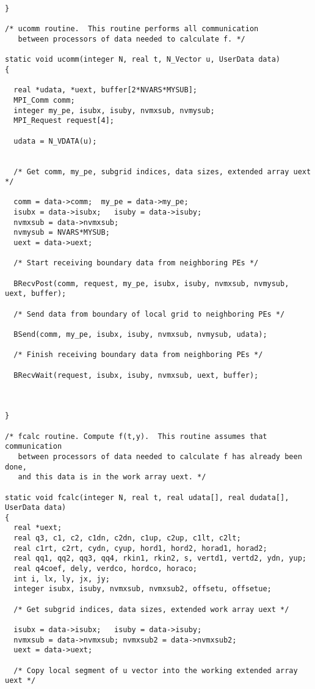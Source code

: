 \begin{verbatim}
}

/* ucomm routine.  This routine performs all communication 
   between processors of data needed to calculate f. */

static void ucomm(integer N, real t, N_Vector u, UserData data)
{

  real *udata, *uext, buffer[2*NVARS*MYSUB];
  MPI_Comm comm;
  integer my_pe, isubx, isuby, nvmxsub, nvmysub;
  MPI_Request request[4];

  udata = N_VDATA(u);


  /* Get comm, my_pe, subgrid indices, data sizes, extended array uext */

  comm = data->comm;  my_pe = data->my_pe;
  isubx = data->isubx;   isuby = data->isuby;
  nvmxsub = data->nvmxsub;
  nvmysub = NVARS*MYSUB;
  uext = data->uext;

  /* Start receiving boundary data from neighboring PEs */

  BRecvPost(comm, request, my_pe, isubx, isuby, nvmxsub, nvmysub, uext, buffer);

  /* Send data from boundary of local grid to neighboring PEs */

  BSend(comm, my_pe, isubx, isuby, nvmxsub, nvmysub, udata);

  /* Finish receiving boundary data from neighboring PEs */

  BRecvWait(request, isubx, isuby, nvmxsub, uext, buffer);



}

/* fcalc routine. Compute f(t,y).  This routine assumes that communication 
   between processors of data needed to calculate f has already been done,
   and this data is in the work array uext. */

static void fcalc(integer N, real t, real udata[], real dudata[], UserData data)
{
  real *uext;
  real q3, c1, c2, c1dn, c2dn, c1up, c2up, c1lt, c2lt;
  real c1rt, c2rt, cydn, cyup, hord1, hord2, horad1, horad2;
  real qq1, qq2, qq3, qq4, rkin1, rkin2, s, vertd1, vertd2, ydn, yup;
  real q4coef, dely, verdco, hordco, horaco;
  int i, lx, ly, jx, jy;
  integer isubx, isuby, nvmxsub, nvmxsub2, offsetu, offsetue;

  /* Get subgrid indices, data sizes, extended work array uext */

  isubx = data->isubx;   isuby = data->isuby;
  nvmxsub = data->nvmxsub; nvmxsub2 = data->nvmxsub2;
  uext = data->uext;

  /* Copy local segment of u vector into the working extended array uext */


\end{verbatim}
